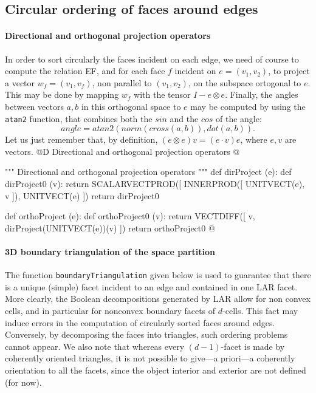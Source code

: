 \documentclass[11pt,oneside]{article}    %
\begin{document}
\subsection{Circular ordering of faces around edges}


\paragraph{Directional and orthogonal projection operators}

In order to sort circularly the faces incident on each edge, we need of course to compute the relation EF, and for each face $f$ incident on $e = (v_1,v_2)$, to project a vector $w_f = (v_1,v_f)$, non parallel to $(v_1,v_2)$, on the subspace ortogonal to $e$. This may be done by mapping $w_f$ with the tensor $I-e \otimes e$. Finally, the angles between vectors $a,b$ in this orthogonal space to $e$ may be computed by using the \texttt{atan2} function, that combines both the $sin$ and the $cos$ of the angle:
\[
angle = atan2(norm(cross(a,b)),dot(a,b)).
\]
Let us just remember that, by definition, $(e \otimes e)v = (e \cdot v)e$, where $e,v$ are vectors.
@D Directional and orthogonal projection operators
@{""" Directional and orthogonal projection operators """
def dirProject (e):
    def dirProject0 (v):
        return SCALARVECTPROD([ INNERPROD([ UNITVECT(e), v ]), UNITVECT(e) ])
    return dirProject0

def orthoProject (e):
    def orthoProject0 (v):  
        return VECTDIFF([ v, dirProject(UNITVECT(e))(v) ])
    return orthoProject0
@}




\paragraph{3D boundary triangulation of the space partition}
The function \texttt{boundaryTriangu\-la\-tion} given below is used to guarantee that there is a unique (simple) facet incident to an edge and contained in one LAR facet. More clearly, the Boolean decompositions generated by LAR allow for non convex cells, and in particular for nonconvex boundary facets of $d$-cells. This fact may induce errors in the computation of circularly sorted faces around edges. Conversely, by decomposing the faces into triangles, such ordering problems cannot appear.  
We also note that whereas every $(d-1)$-facet is made by coherently oriented triangles, it is not possible to give---a priori---a coherently orientation to all the facets, since the object interior and exterior are not defined (for now).
\end{document}
